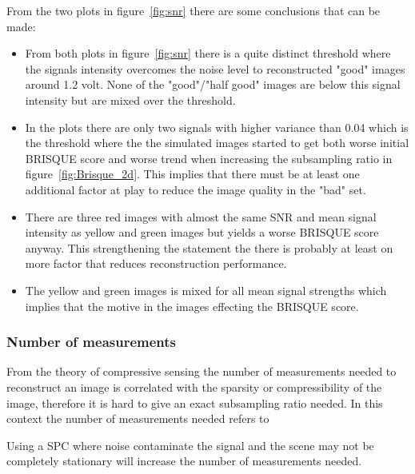 From the two plots in figure~\ref{fig:snr} there are some conclusions that can be made:


\begin{itemize}
\item From both plots in figure~\ref{fig:snr} there is a quite distinct threshold where the signals intensity overcomes the noise level to reconstructed "good" images around 1.2 volt. None of the "good"/"half good" images are below this signal intensity but are mixed over the threshold. 

\item In the plots there are only two signals with higher variance than 0.04 which is the threshold where the the simulated images started to get both worse initial BRISQUE score and worse trend when increasing the subsampling ratio in figure~\ref{fig:Brisque_2d}. This implies that there must be at least one additional factor at play to reduce the image quality in the "bad" set. 


\item There are three red images with almost the same SNR and mean signal intensity as yellow and green images but yields a worse BRISQUE score anyway. This strengthening the statement the there is probably at least on more factor that reduces reconstruction performance.

\item The yellow and green images is mixed for all mean signal strengths which implies that the motive in the images effecting the  BRISQUE score. 

\end{itemize}




\pagebreak

\subsubsection{Number of measurements}
From the theory of compressive sensing the number of measurements needed to reconstruct an image is correlated with the sparsity or compressibility of the image, therefore it is hard to give an exact  subsampling ratio needed. In this context the number of measurements needed refers to 

Using a SPC where noise contaminate the signal and the scene may not be completely stationary will increase the number of measurements needed. 


